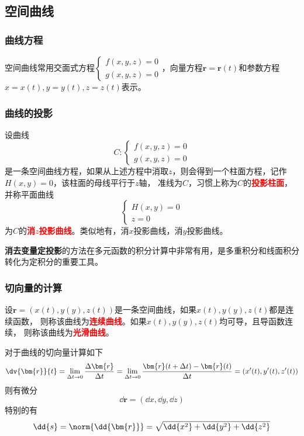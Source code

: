 \subsection{空间曲线}
\subsubsection{曲线方程}
空间曲线常用交面式方程$\displaystyle\begin{cases}
        f(x,y,z)=0 \\
        g(x,y,z)=0
    \end{cases}$，向量方程$\bm{r} = \bm{r}(t)$和参数方程$x=x(t),y=y(t),z=z(t)$表示。

\subsubsection{曲线的投影}
设曲线
\[
    C:
    \begin{cases}
        f(x,y,z)=0 \\
        g(x,y,z)=0
    \end{cases}
\]
是一条空间曲线方程，如果从上述方程中消取$z$，则会得到一个柱面方程，记作$H(x,y)=0$，该柱面的母线平行于$z$轴，
准线为$C$，习惯上称为$C$的\textcolor{red}{\textbf{\textsf{投影柱面}}}，并称平面曲线
\[
    \begin{cases}
        H(x,y)=0 \\
        z=0
    \end{cases}
\]
为$C$的\textcolor{red}{\textbf{\textsf{消$z$投影曲线}}}。类似地有，消$x$投影曲线，消$y$投影曲线。

\textbf{消去变量定投影}的方法在多元函数的积分计算中非常有用，是多重积分和线面积分转化为定积分的重要工具。

\subsubsection{切向量的计算}
设$\bm{r}=(x(t),y(y),z(t))$是一条空间曲线，如果$x(t),y(y),z(t)$都是连续函数，
则称该曲线为\textcolor{red}{\textbf{\textsf{连续曲线}}}。如果$x(t),y(y),z(t)$均可导，且导函数连续，
则称该曲线为\textcolor{red}{\textbf{\textsf{光滑曲线}}}。

对于曲线的切向量计算如下
\begin{equation}
    \dv{\bm{r}}{t}
    = \lim_{\Delta t \to 0}\frac{\Delta \bm{r}}{\Delta t}
    = \lim_{\Delta t \to 0}\frac{\bm{r}(t+\Delta t) - \bm{r}(t)}{\Delta t}
    = (x'(t),y'(t),z'(t))
\end{equation}
则有微分
\begin{equation}
    \dd{\bm{r}} = (\dd{x}, \dd{y}, \dd{z})
\end{equation}
特别的有
\begin{equation}
    \dd{s} = \norm{\dd{\bm{r}}} = \sqrt{\dd{x^2}+ \dd{y^2} + \dd{z^2}}
\end{equation}

